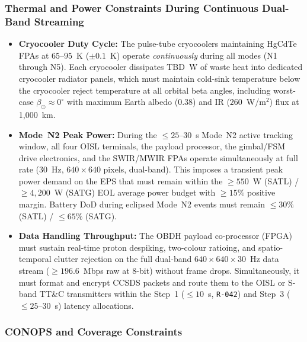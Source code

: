 \subsubsection{Thermal and Power Constraints During Continuous Dual-Band Streaming}

\begin{itemize}
    \item \textbf{Cryocooler Duty Cycle:} The pulse-tube cryocoolers maintaining HgCdTe FPAs at $65$--$95$~K ($\pm 0.1$~K) operate \emph{continuously} during all modes (N1 through N5). Each cryocooler dissipates TBD~W of waste heat into dedicated cryocooler radiator panels, which must maintain cold-sink temperature below the cryocooler reject temperature at all orbital beta angles, including worst-case $\beta_\odot \approx 0^\circ$ with maximum Earth albedo ($0.38$) and IR ($260$~W/m$^2$) flux at 1,000~km.
    \item \textbf{Mode~N2 Peak Power:} During the $\le 25$--$30$~s Mode~N2 active tracking window, all four OISL terminals, the payload processor, the gimbal/FSM drive electronics, and the SWIR/MWIR FPAs operate simultaneously at full rate ($30$~Hz, $640 \times 640$ pixels, dual-band). This imposes a transient peak power demand on the EPS that must remain within the $\ge 550$~W (SATL) / $\ge 4{,}200$~W (SATG) EOL average power budget with $\ge 15\%$ positive margin. Battery DoD during eclipsed Mode~N2 events must remain $\le 30\%$ (SATL) / $\le 65\%$ (SATG).
    \item \textbf{Data Handling Throughput:} The OBDH payload co-processor (FPGA) must sustain real-time proton despiking, two-colour ratioing, and spatio-temporal clutter rejection on the full dual-band $640 \times 640 \times 30$~Hz data stream ($\ge 196.6$~Mbps raw at 8-bit) without frame drops. Simultaneously, it must format and encrypt CCSDS packets and route them to the OISL or S-band TT\&C transmitters within the Step~1 ($\le 10$~s, \texttt{R-042}) and Step~3 ($\le 25$--$30$~s) latency allocations.
\end{itemize}

\subsubsection{CONOPS and Coverage Constraints}


